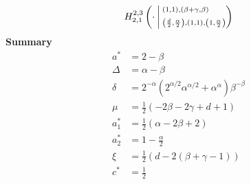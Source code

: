 \documentclass{article}
\newcommand{\FoxH}[5]{H_{#2}^{#1}\left(#3\:\middle\vert\: \begin{subarray}{l}#4\\[0.4em] #5\end{subarray}\right)}
\begin{document}
\begin{align*}
\FoxH{2,3}{2,1}{\cdot}{\left(1, 1\right), \left(\beta +\gamma, \beta\right)}{\left(\frac{d}{2}, \frac{\alpha }{2}\right), \left(1, 1\right), \left(1, \frac{\alpha }{2}\right)}
\end{align*}
\noindent\textbf{Summary}
\begin{align*}
a^* &= 2-\beta \\
\Delta &= \alpha -\beta \\
\delta &= 2^{-\alpha } \left(2^{\alpha /2} \alpha ^{\alpha /2}+\alpha ^{\alpha }\right) \beta ^{-\beta } \\
\mu &= \frac{1}{2} (-2 \beta -2 \gamma +d+1) \\
a_1^* &= \frac{1}{2} (\alpha -2 \beta +2) \\
a_2^* &= 1-\frac{\alpha }{2} \\
\xi &= \frac{1}{2} (d-2 (\beta +\gamma -1)) \\
c^* &= \frac{1}{2} \\
\end{align*}
\end{document}

